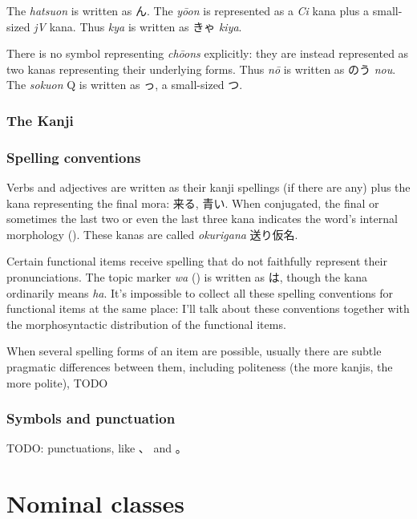\documentclass[UTF8, a4paper, oneside, scheme=plain]{ctexrep}
\newcommand*{\term}[1]{\emph{#1}}
\newcommand{\corpus}[1]{\emph{#1}}
\begin{document}
The \corpus{hatsuon} is written as ん. 
The \corpus{y\={o}on} is represented as a \corpus{Ci} kana plus a small-sized \corpus{jV} kana.
Thus \corpus{kya} is written as きゃ \corpus{kiya}.

There is no symbol representing \corpus{ch\={o}ons} explicitly:
they are instead represented as two kanas representing their underlying forms.
Thus \corpus{n\={o}} is written as のう \corpus{nou}.
The \corpus{sokuon} Q is written as っ, a small-sized つ.

\subsection{The Kanji}\label{sec:kanji}


\subsection{Spelling conventions}\label{sec:spelling-conventions}

Verbs and adjectives are written as their kanji spellings (if there are any)
plus the kana representing the final mora:
来る, 青い.
When conjugated, the final or sometimes the last two or even the last three
kana indicates the word's internal morphology (). 
These kanas are called \term{okurigana} 送り仮名.

Certain functional items receive spelling that do not faithfully represent their pronunciations.
The topic marker \corpus{wa} () is written as は,
though the kana ordinarily means \corpus{ha}.
It's impossible to collect all these spelling conventions for functional items at the same place:
I'll talk about these conventions together with the morphosyntactic distribution of the functional items.

When several spelling forms of an item are possible,
usually there are subtle pragmatic differences between them,
including politeness (the more kanjis, the more polite), TODO

\subsection{Symbols and punctuation}\label{sec:writing-symbols}



TODO: punctuations, like 、 and 。

\chapter{Nominal classes}
\end{document}
